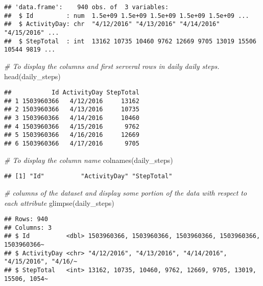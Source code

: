 \documentclass[
]{article}
\newenvironment{Shaded}{\begin{snugshade}}{\end{snugshade}}
\newcommand{\CommentTok}[1]{\textcolor[rgb]{0.56,0.35,0.01}{\textit{#1}}}
\newcommand{\FunctionTok}[1]{\textcolor[rgb]{0.00,0.00,0.00}{#1}}
\newcommand{\NormalTok}[1]{#1}
\begin{document}
\begin{verbatim}
## 'data.frame':    940 obs. of  3 variables:
##  $ Id         : num  1.5e+09 1.5e+09 1.5e+09 1.5e+09 1.5e+09 ...
##  $ ActivityDay: chr  "4/12/2016" "4/13/2016" "4/14/2016" "4/15/2016" ...
##  $ StepTotal  : int  13162 10735 10460 9762 12669 9705 13019 15506 10544 9819 ...
\end{verbatim}

\begin{Shaded}
\begin{Highlighting}[]
\CommentTok{\# To display the columns and first serveral rows in daily daily steps.}
\FunctionTok{head}\NormalTok{(daily\_steps)}
\end{Highlighting}
\end{Shaded}

\begin{verbatim}
##           Id ActivityDay StepTotal
## 1 1503960366   4/12/2016     13162
## 2 1503960366   4/13/2016     10735
## 3 1503960366   4/14/2016     10460
## 4 1503960366   4/15/2016      9762
## 5 1503960366   4/16/2016     12669
## 6 1503960366   4/17/2016      9705
\end{verbatim}

\begin{Shaded}
\begin{Highlighting}[]
\CommentTok{\# To display the column name }
\FunctionTok{colnames}\NormalTok{(daily\_steps)}
\end{Highlighting}
\end{Shaded}

\begin{verbatim}
## [1] "Id"          "ActivityDay" "StepTotal"
\end{verbatim}

\begin{Shaded}
\begin{Highlighting}[]
\CommentTok{\# columns of the dataset and display some portion of the data with respect to each attribute}
\FunctionTok{glimpse}\NormalTok{(daily\_steps)}
\end{Highlighting}
\end{Shaded}

\begin{verbatim}
## Rows: 940
## Columns: 3
## $ Id          <dbl> 1503960366, 1503960366, 1503960366, 1503960366, 1503960366~
## $ ActivityDay <chr> "4/12/2016", "4/13/2016", "4/14/2016", "4/15/2016", "4/16/~
## $ StepTotal   <int> 13162, 10735, 10460, 9762, 12669, 9705, 13019, 15506, 1054~
\end{verbatim}
\end{document}
